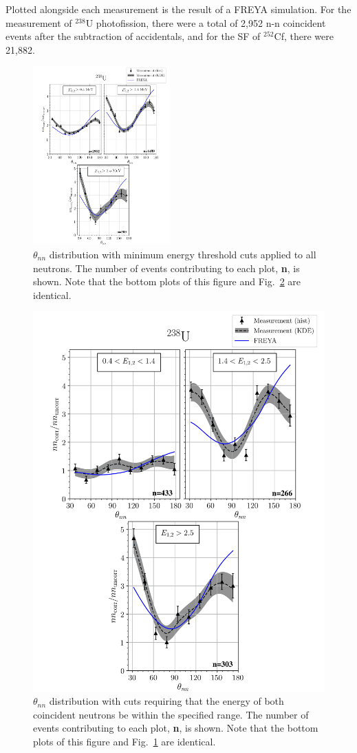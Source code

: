 \documentclass[%
 reprint,
 amsmath,amssymb,
 aps,
 nofootinbib
]{revtex4-1}
\begin{document}
Plotted alongside each measurement is the result of a FREYA simulation.
For the measurement of $^{238}$U photofission, there were a total of 2,952 n-n coincident events after the subtraction of accidentals, and for the SF of $^{252}$Cf, there were  21,882.
\FloatBarrier
\begin{figure}
\centering
    \includegraphics[width = 0.47\textwidth]{FinalDUResultw_freya0(fix)KDE.png}
    \caption{$\theta_{nn}$ distribution with minimum energy threshold cuts applied to all neutrons.
    The number of events contributing to each plot, \textbf{n}, is shown. Note that the bottom plots of this figure and Fig.~\ref{fig:DU(2)} are identical.}
    \label{fig:DU(0)}
\end{figure}
\begin{figure}
\centering
    \includegraphics[width = .47\textwidth]{FinalDUResultw_freya2KDE(fix).png}
    \caption{ $\theta_{nn}$ distribution with cuts requiring that the energy of both coincident neutrons be within the specified range.
    The number of events contributing to each plot, \textbf{n}, is shown. Note that the bottom plots of this figure and Fig.~\ref{fig:DU(0)} are identical.}
    \label{fig:DU(2)}
\end{figure}
\end{document}
